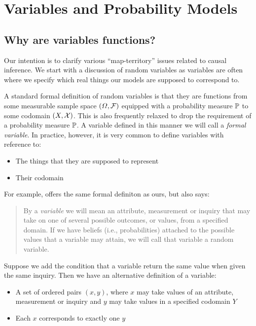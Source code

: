 

\section{Variables and Probability Models}\label{sec:vague_variables}

\subsection{Why are variables functions?}\label{sec:variables}


Our intention is to clarify various ``map-territory'' issues related to causal inference. We start with a discussion of random variables as variables are often where we specify which real things our models are supposed to correspond to.

A standard formal definition of random variables is that they are functions from some measurable sample space $(\Omega,\mathcal{F})$ equipped with a probability measure $\mathbb{P}$ to some codomain $(X,\mathcal{X})$. This is also frequently relaxed to drop the requirement of a probability measure $\mathbb{P}$. A variable defined in this manner we will call a \emph{formal variable}. In practice, however, it is very common to define variables with reference to:
\begin{itemize}
	\item The things that they are supposed to represent
	\item Their codomain
\end{itemize}

For example, \citet{pearl_causality:_2009} offers the same formal definiton as ours, but also says:
\begin{quote}
By a \emph{variable} we will mean an attribute, measurement or inquiry that may take on one of several possible outcomes, or values, from a specified domain. If we have beliefs (i.e., probabilities) attached to the possible values that a variable may attain, we will call that variable a random variable.
\end{quote}
Suppose we add the condition that a variable return the same value when given the same inquiry. Then we have an alternative definition of a variable:
\begin{itemize}
	\item A set of ordered pairs $(x,y)$, where $x$ may take values of an attribute, measurement or inquiry and $y$ may take values in a specified codomain $Y$ 
	\item Each $x$ corresponds to exactly one $y$
\end{itemize}

